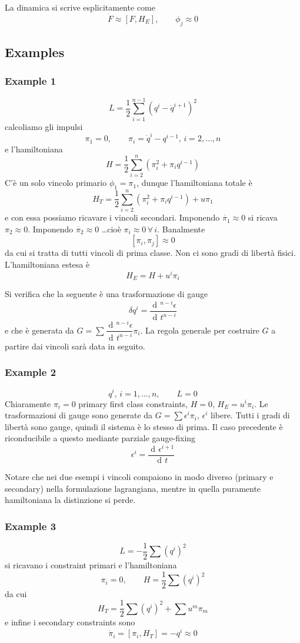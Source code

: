 \documentclass[a4paper, 11pt]{article}
\newcommand{\dd}{\mathop{\mathrm{d}\!}{}}
\newcommand{\deriv}[2]{\dfrac{\dd #1}{\dd #2}}
\begin{document}
	La dinamica si scrive esplicitamente come
	\[ \dot{F} \approx [F, H_E],\qquad \phi_j \approx 0 \]
	
	\subsection{Examples}
	\subsubsection{Example 1}
	\[ L = \dfrac{1}{2} \sum_{i=1}^{n-1} (q^i-\dot{q}^{i+1})^2 \]
	calcoliamo gli impulsi
	\[ \pi_1 = 0,\qquad \pi_i = \dot{q}^i-q^{i-1},\,i=2,\dots,n \]
	e l'hamiltoniana
	\[ H = \dfrac{1}{2} \sum_{i=2}^{n} \left(\pi_i^2 + \pi_i q^{i-1}\right) \]
	C'è un solo vincolo primario $\phi_1 = \pi_1$, dunque l'hamiltoniana totale è
	\[ H_T = \dfrac{1}{2} \sum_{i=2}^{n} \left(\pi_i^2 + \pi_i q^{i-1}\right) + u \pi_1 \]
	e con essa possiamo ricavare i vincoli secondari. Imponendo $\dot{\pi_1}\approx 0$ si ricava $\pi_2 \approx 0$. Imponendo $\dot{\pi_2} \approx 0$ \dots cioè $\pi_i \approx 0\,\forall\,i$. Banalmente
	\[ [\pi_i, \pi_j] \approx 0 \]
	da cui si tratta di tutti vincoli di prima classe. Non ci sono gradi di libertà fisici.
	L'hamiltoniana estesa è
	\[ H_E = H + u^i \pi_i \]
	
	Si verifica che la seguente è una trasformazione di gauge
	\[ \delta q^i = \deriv{^{n-i} \epsilon}{t^{n-i}} \]
	e che è generata da $G = \sum \deriv{^{n-i} \epsilon}{t^{n-i}} \pi_i$. La regola generale per costruire $G$ a partire dai vincoli sarà data in seguito.
	
	\subsubsection{Example 2}
	\[ q^i,\,i=1,\dots,n,\qquad L=0 \]
	Chiaramente $\pi_i = 0$ primary first class constraints, $H=0$, $H_E = u^i \pi_i$. Le trasformazioni di gauge sono generate da $G = \sum \epsilon^i \pi_i$, $\epsilon^i$ libere. Tutti i gradi di libertà sono gauge, quindi il sistema è lo stesso di prima. Il caso precedente è riconducibile a questo mediante parziale gauge-fixing
	\[ \epsilon^i = \deriv{\epsilon^{i+1}}{t} \]
	
	Notare che nei due esempi i vincoli compaiono in modo diverso (primary e secondary) nella formulazione lagrangiana, mentre in quella puramente hamiltoniana la distinzione si perde.
	
	\subsubsection{Example 3}
	\[ L = -\dfrac{1}{2} \sum (q^i)^2 \]
	si ricavano i constraint primari e l'hamiltoniana
	\[ \pi_i = 0,\qquad H = \dfrac{1}{2} \sum (q^i)^2 \]
	da cui
	\[ H_T = \dfrac{1}{2} \sum (q^i)^2 + \sum u^m \pi_m \]
	e infine i secondary constraints sono
	\[ \dot{\pi}_i = [\pi_i, H_T] = -q^i \approx 0 \]
	
\end{document}
